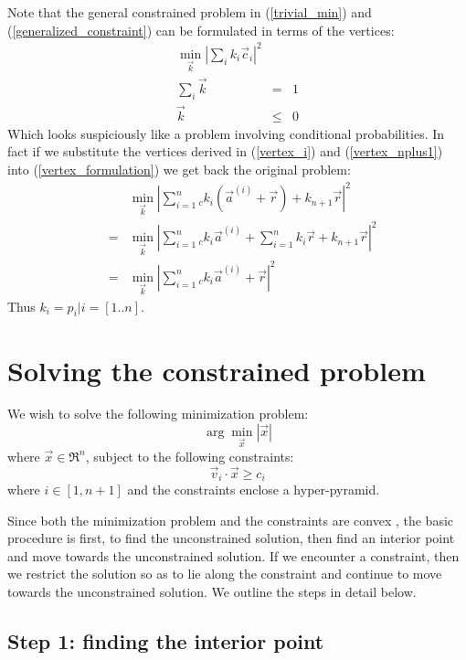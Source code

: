 \documentclass{article}
\begin{document}
Note that the general constrained problem in (\ref{trivial_min}) 
and (\ref{generalized_constraint}) can be formulated in terms of the vertices:
\begin{eqnarray}
	\min_{\vec k} \left |\sum_i k_i \vec c_i \right |^2 & & \label{vertex_formulation}\\
	\sum_i \vec k & = & 1 \\
	\vec k & \le & 0
\end{eqnarray}
Which looks suspiciously like a problem involving conditional probabilities.
In fact if we substitute the vertices derived in (\ref{vertex_i}) and
(\ref{vertex_nplus1}) into (\ref{vertex_formulation}) we get back the
original problem:
\begin{eqnarray}
	& & \min_{\vec k} \left |\sum_{i=1}^n_c k_i (\vec a^{(i)} + \vec r) + k_{n+1} \vec r \right |^2\\
	& = & \min_{\vec k} \left |\sum_{i=1}^n_c k_i \vec a^{(i)} + \sum_{i=1}^n k_i \vec r + k_{n+1} \vec r \right |^2\\
	& = & \min_{\vec k} \left |\sum_{i=1}^n_c k_i \vec a^{(i)} + \vec r \right |^2
\end{eqnarray}
Thus $k_i=p_i|i=[1..n]$.

\section{Solving the constrained problem}

We wish to solve the following minimization problem:
\begin{equation}
	\arg \min_{\vec x} |\vec x|
\end{equation}
where $\vec x \in \Re^n$, subject to the following constraints:
\begin{equation}
	\vec v_i \cdot \vec x \ge c_i
\end{equation}
where $i \in [1, n+1]$ and the constraints enclose a hyper-pyramid.

Since both the minimization problem and the constraints are convex 
\citep{Boyd_etal2004}, the basic procedure is first, to find the unconstrained
solution, then find an interior point and move towards the unconstrained
solution. If we encounter a constraint, then we restrict the solution so as
to lie along the constraint and continue to move towards the unconstrained
solution. We outline the steps in detail below.

\subsection{Step 1: finding the interior point}
\end{document}
